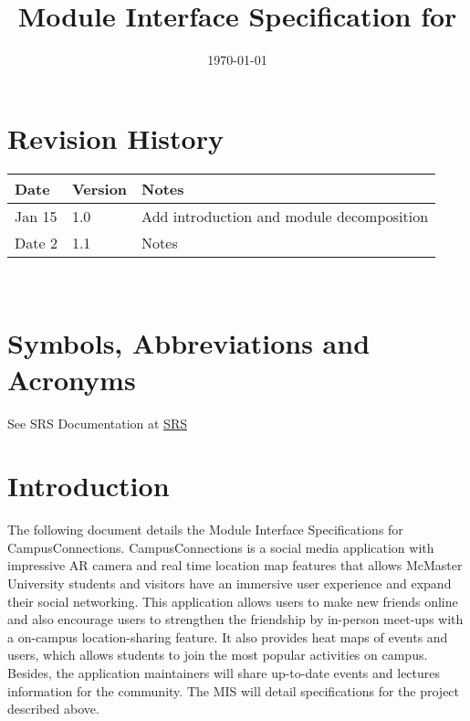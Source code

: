 \documentclass[12pt, titlepage]{article}
\begin{document}
\title{Module Interface Specification for \progname{}}

\author{\authname}

\date{\today}

\maketitle


\section{Revision History}

\begin{tabularx}{\textwidth}{p{3cm}p{2cm}X}
\toprule {\bf Date} & {\bf Version} & {\bf Notes}\\
\midrule
Jan 15 & 1.0 & Add introduction and module decomposition\\
Date 2 & 1.1 & Notes\\
\bottomrule
\end{tabularx}

~\newpage

\section{Symbols, Abbreviations and Acronyms}

See SRS Documentation at \href{https://github.com/beatlepie/4G06CapstoneProjectTeam2/blob/main/docs/SRS-Volere/SRS.pdf}{SRS}

\newpage

\tableofcontents

\newpage


\section{Introduction}

The following document details the Module Interface Specifications for CampusConnections. CampusConnections is a social media application with impressive AR camera and real time location map features that allows McMaster University students and visitors have an immersive user experience and expand their social networking. This application allows users to make new friends online and also encourage users to strengthen the friendship by in-person meet-ups with a on-campus location-sharing feature. It also provides heat maps of events and users, which allows students to join the most popular activities on campus. Besides, the application maintainers will share up-to-date events and lectures information for the community. The MIS will detail specifications for the project described above.
\end{document}
